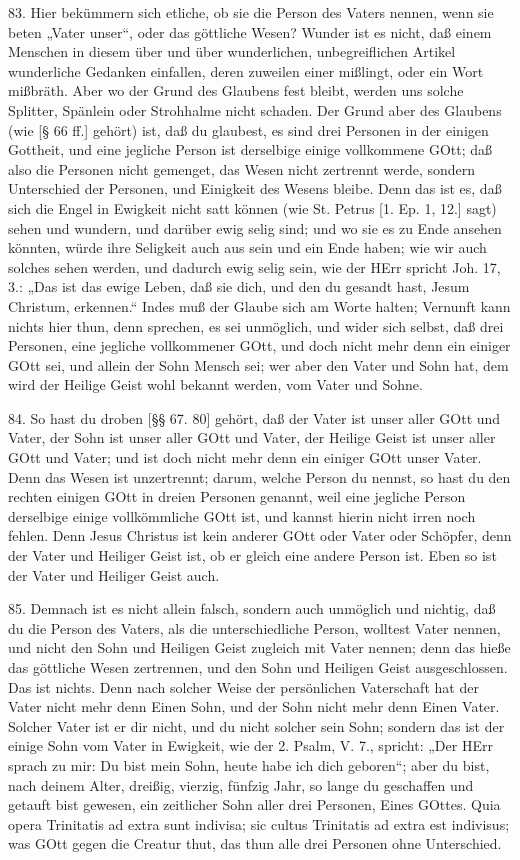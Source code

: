 83. Hier bekümmern sich etliche, ob sie die Person des Vaters nennen, wenn sie beten „Vater unser“, oder das göttliche Wesen? Wunder ist es nicht, daß einem Menschen in diesem über und über wunderlichen, unbegreiflichen Artikel wunderliche Gedanken einfallen, deren zuweilen einer mißlingt, oder ein Wort mißbräth. Aber wo der Grund des Glaubens fest bleibt, werden uns solche Splitter, Spänlein oder Strohhalme nicht schaden. Der Grund aber des Glaubens (wie [§ 66 ff.] gehört) ist, daß du glaubest, es sind drei Personen in der einigen Gottheit, und eine jegliche Person ist derselbige einige vollkommene GOtt; daß also die Personen nicht gemenget, das Wesen nicht zertrennt werde, sondern Unterschied der Personen, und Einigkeit des Wesens bleibe. Denn das ist es, daß sich die Engel in Ewigkeit nicht satt können (wie St. Petrus [1. Ep. 1, 12.] sagt) sehen und wundern, und darüber ewig selig sind; und wo sie es zu Ende ansehen könnten, würde ihre Seligkeit auch aus sein und ein Ende haben; wie wir auch solches sehen werden, und dadurch ewig selig sein, wie der HErr spricht Joh. 17, 3.: „Das ist das ewige Leben, daß sie dich, und den du gesandt hast, Jesum Christum, erkennen.“ Indes muß der Glaube sich am Worte halten; Vernunft kann nichts hier thun, denn sprechen, es sei unmöglich, und wider sich selbst, daß drei Personen, eine jegliche vollkommener GOtt, und doch nicht mehr denn ein einiger GOtt sei, und allein der Sohn Mensch sei; wer aber den Vater und Sohn hat, dem wird der Heilige Geist wohl bekannt werden, vom Vater und Sohne.

84. So hast du droben [§§ 67. 80] gehört, daß der Vater ist unser aller GOtt und Vater, der Sohn ist unser aller GOtt und Vater, der Heilige Geist ist unser aller GOtt und Vater; und ist doch nicht mehr denn ein einiger GOtt unser Vater. Denn das Wesen ist unzertrennt; darum, welche Person du nennst, so hast du den rechten einigen GOtt in dreien Personen genannt, weil eine jegliche Person derselbige einige vollkömmliche GOtt ist, und kannst hierin nicht irren noch fehlen. Denn Jesus Christus ist kein anderer GOtt oder Vater oder Schöpfer, denn der Vater und Heiliger Geist ist, ob er gleich eine andere Person ist. Eben so ist der Vater und Heiliger Geist auch.

85. Demnach ist es nicht allein falsch, sondern auch unmöglich und nichtig, daß du die Person des Vaters, als die unterschiedliche Person, wolltest Vater nennen, und nicht den Sohn und Heiligen Geist zugleich mit Vater nennen; denn das hieße das göttliche Wesen zertrennen, und den Sohn und Heiligen Geist ausgeschlossen. Das ist nichts. Denn nach solcher Weise der persönlichen Vaterschaft hat der Vater nicht mehr denn Einen Sohn, und der Sohn nicht mehr denn Einen Vater. Solcher Vater ist er dir nicht, und du nicht solcher sein Sohn; sondern das ist der einige Sohn vom Vater in Ewigkeit, wie der 2. Psalm, V. 7., spricht: „Der HErr sprach zu mir: Du bist mein Sohn, heute habe ich dich geboren“; aber du bist, nach deinem Alter, dreißig, vierzig, fünfzig Jahr, so lange du geschaffen und getauft bist gewesen, ein zeitlicher Sohn aller drei Personen, Eines GOttes. Quia opera Trinitatis ad extra sunt indivisa; sic cultus Trinitatis ad extra est indivisus; was GOtt gegen die Creatur thut, das thun alle drei Personen ohne Unterschied.

